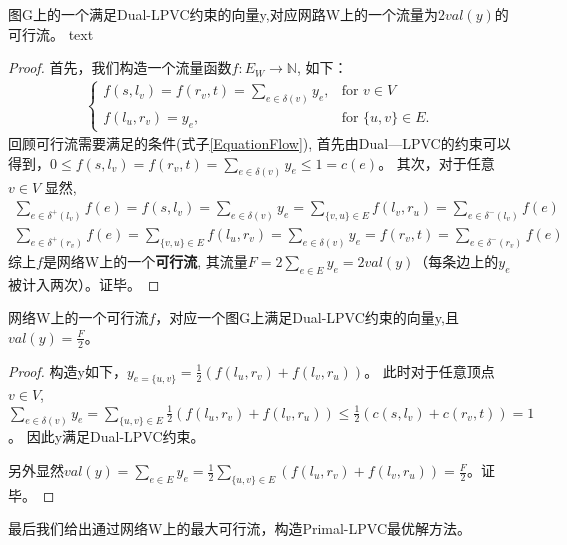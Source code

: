 \begin{property}
图G上的一个满足Dual-LPVC约束的向量y,对应网路W上的一个流量为$2val(y)$的可行流。
text
\end{property}
\begin{proof}
  首先，我们构造一个流量函数$f:E_W \rightarrow \mathbb{N}$, 如下：
  \begin{equation*}\begin{aligned} \begin{cases}
    f(s, l_v) = f(r_v, t) = \sum\limits_{e \in \delta(v)}{y_e}, & \mbox{for } v \in V \\
    f(l_u, r_v) = y_e, & \mbox{for } \{u, v\} \in E.
  \end{cases}\end{aligned}\end{equation*}
  回顾可行流需要满足的条件(式子\ref{EquationFlow}), 首先由Dual—LPVC的约束可以得到，$0 \le f(s, l_v) = f(r_v, t) = \sum\limits_{e \in \delta(v)}{y_e} \le 1 = c(e)$。
  其次，对于任意$v \in V$ 显然,
  \[ \begin{aligned}
     \sum_{e\in \delta^+(l_v)}{f(e)} = f(s, l_v) = \sum\limits_{e \in \delta(v)}{y_e} = \sum_{\{v, u\} \in E}{f(l_v, r_u)} = \sum_{e\in \delta^-(l_v)}{f(e)} \\
    \sum_{e\in \delta^+(r_v)}{f(e)} = \sum_{\{v, u\} \in E}{f(l_u, r_v)}  = \sum\limits_{e \in \delta(v)}{y_e} = f(r_v, t) = \sum_{e\in \delta^-(r_v)}{f(e)}
  \end{aligned} \]
  综上$f$是网络W上的一个\textbf{可行流}, 其流量$F = 2\sum_{e \in E}{y_e} = 2val(y)$（每条边上的$y_e$被计入两次）。证毕。
\end{proof}

\begin{property}
网络W上的一个可行流$f$，对应一个图G上满足Dual-LPVC约束的向量y,且$val(y) = \frac{F}{2}$。
\end{property}
\begin{proof}
构造y如下，$y_{e = \{u, v\}} = \frac{1}{2}(f(l_u, r_v) + f(l_v, r_u))$。
此时对于任意顶点$v \in V$, $\sum\limits_{e \in \delta(v)}{y_e} = \sum\limits_{\{u, v\}\in E}{\frac{1}{2}(f(l_u, r_v) + f(l_v, r_u))} \le \frac{1}{2}(c(s, l_v) + c(r_v, t)) = 1$。
因此y满足Dual-LPVC约束。

另外显然$val(y) = \sum_{e \in E}{y_e} = \frac{1}{2}\sum\limits_{\{u, v\}\in E}{(f(l_u, r_v) + f(l_v, r_u))} = \frac{F}{2}$。证毕。
\end{proof}

最后我们给出通过网络W上的最大可行流，构造Primal-LPVC最优解方法。

